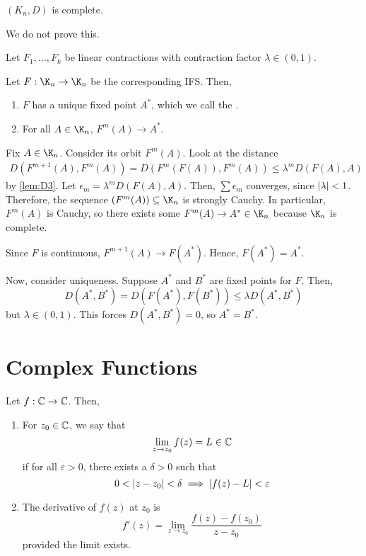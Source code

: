 \documentclass[class=pmath370,tikz,notes]{agony}
\begin{document}
\begin{fact}
  $(K_n, D)$ is complete.
\end{fact}
We do not prove this.

\begin{theorem}
  Let $F_1,\dotsc,F_k$ be linear contractions with contraction factor $\lambda \in (0,1)$.

  Let $F : \K_n \to \K_n$ be the corresponding IFS. Then,
  \begin{enumerate}[nosep]
    \item $F$ has a unique fixed point $A^*$, which we call the .
    \item For all $A \in \K_n$, $F^m(A) \to A^*$.
  \end{enumerate}
\end{theorem}
\begin{prf}
  Fix $A \in \K_n$. Consider its orbit $F^m(A)$. Look at the distance
  \begin{align*}
    D(F^{m+1}(A), F^m(A)) = D(F^m(F(A)), F^m(A)) \leq \lambda^m D(F(A),A)
  \end{align*}
  by \cref{lem:D3}. Let $\epsilon_m = \lambda^m D(F(A),A)$.
  Then, $\sum \epsilon_m$ converges, since $\abs{\lambda} < 1$.
  Therefore, the sequence $(F^m(A)) \subseteq \K_n$ is strongly Cauchy.
  In particular, $F^m(A)$ is Cauchy,
  so there exists some $F^m(A) \to A^* \in \K_n$ because $\K_n$ is complete.

  Since $F$ is continuous, $F^{m+1}(A) \to F(A^*)$.
  Hence, $F(A^*) = A^*$.

  Now, consider uniqueness.
  Suppose $A^*$ and $B^*$ are fixed points for $F$. Then,
  \[
    D(A^*, B^*) = D(F(A^*), F(B^*)) \leq \lambda D(A^*, B^*)
  \]
  but $\lambda \in (0,1)$. This forces $D(A^*, B^*) = 0$, so $A^* = B^*$.
\end{prf}

\chapter{Complex Functions}

\begin{defn*}
  Let $f : \mathbb{C} \to \mathbb{C}$. Then,
  \begin{enumerate}
    \item For $z_0 \in \mathbb{C}$, we say that
          \[ \lim_{z \to z_0}f(z) = L \in \mathbb{C} \]
          if for all $\varepsilon > 0$, there exists a $\delta > 0$ such that
          \[ 0 < \abs{z - z_0} < \delta \implies \abs{f(z) - L} < \varepsilon \]
    \item The derivative of $f(z)$ at $z_0$ is
          \[ f'(z) = \lim_{z \to z_0} \frac{f(z) - f(z_0)}{z-z_0} \]
          provided the limit exists.
  \end{enumerate}
\end{defn*}
\end{document}
